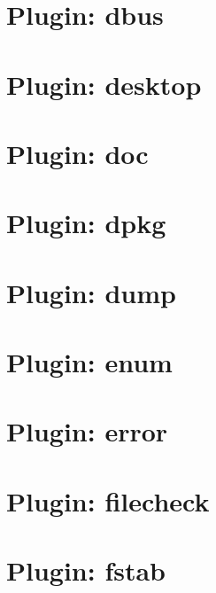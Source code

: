 \documentclass[twoside]{book}
\newcommand{\+}{\discretionary{\mbox{\scriptsize$\hookleftarrow$}}{}{}}
\begin{document}
\chapter{Plugin\+: dbus}
\label{md_src_plugins_dbus_README}
\hypertarget{md_src_plugins_dbus_README}{}

\chapter{Plugin\+: desktop}
\label{md_src_plugins_desktop_README}
\hypertarget{md_src_plugins_desktop_README}{}

\chapter{Plugin\+: doc}
\label{md_src_plugins_doc_README}
\hypertarget{md_src_plugins_doc_README}{}

\chapter{Plugin\+: dpkg}
\label{md_src_plugins_dpkg_README}
\hypertarget{md_src_plugins_dpkg_README}{}

\chapter{Plugin\+: dump}
\label{md_src_plugins_dump_README}
\hypertarget{md_src_plugins_dump_README}{}

\chapter{Plugin\+: enum}
\label{md_src_plugins_enum_README}
\hypertarget{md_src_plugins_enum_README}{}

\chapter{Plugin\+: error}
\label{md_src_plugins_error_README}
\hypertarget{md_src_plugins_error_README}{}

\chapter{Plugin\+: filecheck}
\label{md_src_plugins_filecheck_README}
\hypertarget{md_src_plugins_filecheck_README}{}

\chapter{Plugin\+: fstab}
\label{md_src_plugins_fstab_README}
\hypertarget{md_src_plugins_fstab_README}{}

\end{document}
